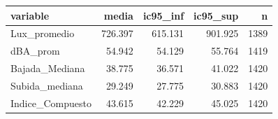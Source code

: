 \begin{tabular}{lrrrr}
\toprule
variable & media & ic95\_inf & ic95\_sup & n \\
\midrule
Lux\_promedio & 726.397 & 615.131 & 901.925 & 1389 \\
dBA\_prom & 54.942 & 54.129 & 55.764 & 1419 \\
Bajada\_Mediana & 38.775 & 36.571 & 41.022 & 1420 \\
Subida\_mediana & 29.249 & 27.775 & 30.883 & 1420 \\
Indice\_Compuesto & 43.615 & 42.229 & 45.025 & 1420 \\
\bottomrule
\end{tabular}
